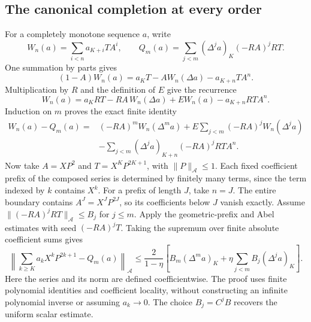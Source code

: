 \subsection{The canonical completion at every order}
For a completely monotone sequence $a$, write
\[
 W_n(a)=\sum_{i<n}a_{K+i}TA^i,\qquad
 Q_m(a)=\sum_{j<m}(\Delta^j a)_K(-RA)^jRT.
\]
One summation by parts gives
\[
 (1-A)W_n(a)=a_KT-AW_n(\Delta a)-a_{K+n}TA^n.
\]
Multiplication by $R$ and the definition of $E$ give the recurrence
\[
 W_n(a)=a_KRT-RA\,W_n(\Delta a)+E W_n(a)-a_{K+n}RT A^n.
\]
Induction on $m$ proves the exact finite identity
\begin{align*}
 W_n(a)-Q_m(a)
 ={}&(-RA)^mW_n(\Delta^m a)
   +E\sum_{j<m}(-RA)^jW_n(\Delta^j a)\\
 &-\sum_{j<m}(\Delta^j a)_{K+n}(-RA)^jRT A^n.
\end{align*}
Now take $A=XP^2$ and $T=X^KP^{2K+1}$, with
$\|P\|_{\mathcal A}\le1$.
Each fixed coefficient prefix of the composed series is determined by
finitely many terms, since the term indexed by $k$ contains $X^k$.
For a prefix of length $J$, take $n=J$. The entire boundary contains
$A^J=X^JP^{2J}$, so its coefficients below $J$ vanish exactly.
Assume $\|(-RA)^jRT\|_{\mathcal A}\le B_j$ for $j\le m$.
Apply the geometric-prefix and Abel estimates with seed $(-RA)^jT$.
Taking the supremum over finite absolute coefficient sums gives
\[
 \left\|\sum_{k\ge K}a_kX^kP^{2k+1}-Q_m(a)\right\|_{\mathcal A}
 \le\frac{2}{1-\eta}
 \left[B_m(\Delta^m a)_K+
       \eta\sum_{j<m}B_j(\Delta^j a)_K\right].
\]
Here the series and its norm are defined coefficientwise. The proof uses
finite polynomial identities and coefficient locality, without constructing
an infinite polynomial inverse or assuming $a_k\to0$.
The choice $B_j=C^jB$ recovers the uniform scalar estimate.

